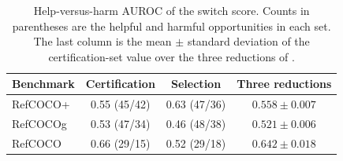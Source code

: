 \begin{table}[H]
\caption{Help-versus-harm AUROC of the switch score.  Counts in parentheses
are the helpful and harmful opportunities in each set.  The last column is the
mean $\pm$ standard deviation of the certification-set value over the three
reductions of .\label{tab:auroc}}
\centering
\small
\begin{tabular}{@{}lccc@{}}
\toprule
Benchmark & Certification & Selection & Three reductions \\
\midrule
RefCOCO+ & 0.55 (45/42) & 0.63 (47/36) & $0.558\pm0.007$ \\
RefCOCOg & 0.53 (47/34) & 0.46 (48/38) & $0.521\pm0.006$ \\
RefCOCO & 0.66 (29/15) & 0.52 (29/18) & $0.642\pm0.018$ \\
\bottomrule
\end{tabular}
\end{table}

